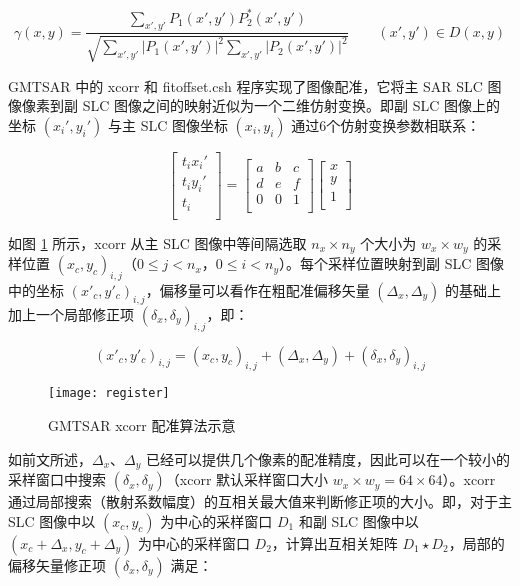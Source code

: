 \begin{equation}
    \gamma(x, y) = \frac{\sum_{x', y'} P_1(x', y') P_2^*(x', y')}{\sqrt{\sum_{x', y'}|P_1(x', y')|^2 \sum_{x', y'}|P_2(x', y')|^2}} \qquad (x', y') \in D(x, y)
    \label{eq:coherence}
\end{equation}

GMTSAR 中的 xcorr 和 fitoffset.csh 程序实现了图像配准，它将主 SAR SLC 图像像素到副 SLC 图像之间的映射近似为一个二维仿射变换。即副 SLC 图像上的坐标 $(x_i', y_i')$ 与主 SLC 图像坐标 $(x_i, y_i)$ 通过6个仿射变换参数相联系：

\begin{equation}
\begin{bmatrix}
  t_i x_i' \\
  t_i y_i' \\
  t_i \\
\end{bmatrix}
= \begin{bmatrix}
       a & b & c \\
       d & e & f \\
       0 & 0 & 1 \\
\end{bmatrix}
\begin{bmatrix}
  x \\
  y \\
  1 \\
\end{bmatrix}
\end{equation}

如图 \ref{fig:register} 所示，xcorr 从主 SLC 图像中等间隔选取 $n_x \times n_y $ 个大小为 $w_x \times w_y$ 的采样位置 $(x_c, y_c)_{i,j}$（$0 \leq j < n_x$，$0 \leq i < n_y$）。每个采样位置映射到副 SLC 图像中的坐标 $(x'_c, y'_c)_{i,j}$，偏移量可以看作在粗配准偏移矢量 $(\Delta_x, \Delta_y)$ 的基础上加上一个局部修正项 $(\delta_x, \delta_y)_{i,j}$，即：

\begin{equation}
    (x'_c, y'_c)_{i,j} = (x_c, y_c)_{i,j} + (\Delta_x, \Delta_y) + (\delta_x, \delta_y)_{i,j}
\end{equation}

\begin{figure}[htbp]
\centering
\texttt{[image: register]}
\caption{GMTSAR xcorr 配准算法示意} \label{fig:register}
\end{figure}

如前文所述，$\Delta_x$、$\Delta_y$ 已经可以提供几个像素的配准精度，因此可以在一个较小的采样窗口中搜索 $(\delta_x, \delta_y)$（xcorr 默认采样窗口大小 $w_x \times w_y = 64 \times 64$）。xcorr 通过局部搜索（散射系数幅度）的互相关最大值来判断修正项的大小。即，对于主 SLC 图像中以 $(x_c, y_c)$ 为中心的采样窗口 $D_1$ 和副 SLC 图像中以 $(x_c + \Delta_x, y_c + \Delta_y)$ 为中心的采样窗口 $D_2$，计算出互相关矩阵 $D_1 \star D_2$，局部的偏移矢量修正项 $(\delta_x, \delta_y)$ 满足：

